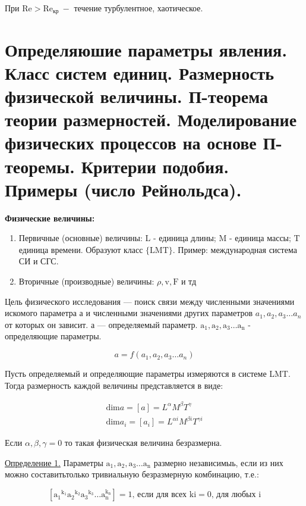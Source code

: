 При $\mathrm{Re}>\mathrm{Re}_{\text {кр }}-$ течение турбулентное, хаотическое.

\section{Определяюшие параметры явления. Класс систем единиц. Размерность физической величины. П-теорема теории размерностей. Моделирование физических процессов на основе П-теоремы. Критерии подобия. Примеры (число Рейнольдса).}
\textbf{Физические величины:}
\begin{enumerate}
  \item Первичные (основные) величины: L - единица длины; $\mathrm{M}$ - единица массы; $\mathrm{T}$ единица времени. Образуют класс $\{\mathrm{LMT}\}$. Пример: международная система СИ и СГС.

  \item Вторичные (производные) величины: $\rho, \mathrm{v}, \mathrm{F}$ и тд

\end{enumerate}

Цель физического исследования --- поиск связи между численными значениями искомого параметра а и численными значениями других параметров $a_{1}, a_{2}, a_{3} \ldots a_{n}$ от которых он зависит. а --- определяемый параметр. $\mathrm{a}_{1}, \mathrm{a}_{2}, \mathrm{a}_{3} \ldots \mathrm{a}_{\mathrm{n}}$ - определяющие параметры.

$$
a=f\left(a_{1}, a_{2}, a_{3} \ldots a_{n}\right)
$$

Пусть определяемый и определяющие параметры измеряются в системе LMT. Тогда размерность каждой величины представляется в виде:

$$
\begin{gathered}
\mathrm{dim} a=[a]=L^{\alpha} M^{\beta} T^{\gamma} \\
\mathrm{dim} a_{i}=\left[a_{i}\right]=L^{\alpha i} M^{\beta i} T^{\gamma i}
\end{gathered}
$$

Если $\alpha, \beta, \gamma=0$ то такая физическая величина безразмерна.

\underline{Определение 1.} Параметры $\mathrm{a}_{1}, \mathrm{a}_{2}, \mathrm{a}_{3} \ldots \mathrm{a}_{\mathrm{n}}$ размерно независимыь, если из них можно составитьтолько тривиальную безразмерную комбинацию, т.е.:

$$
\left[\mathrm{a}_{1}{ }^{\mathrm{k}_1} \mathrm{a}_{2}{ }^{\mathrm{k}_2} \mathrm{a}_{3}{ }^{\mathrm{k}_3} \ldots \mathrm{a}_{\mathrm{n}}^{\mathrm{k_n}}\right]=1 \text {, если для всех } \mathrm{ki}=0 \text {, для любых } \mathrm{i}
$$

